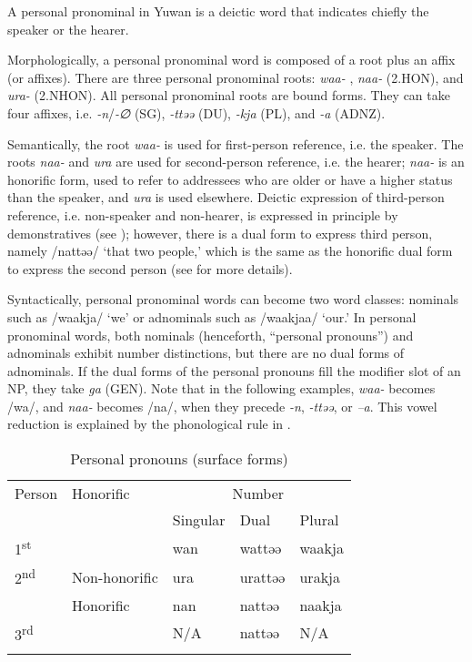 A personal pronominal in Yuwan is a deictic word that indicates chiefly the speaker or the hearer.

Morphologically, a personal pronominal word is composed of a root plus an affix (or affixes). There are three personal pronominal roots: \textit{waa-} , \textit{naa-} (2.HON), and \textit{ura-} (2.NHON). All personal pronominal roots are bound forms. They can take four affixes, i.e. \textit{{}-n}/\textit{{}-∅} (SG), \textit{{}-ttəə} (DU), \textit{{}-kja} (PL), and \textit{{}-a} (ADNZ).

Semantically, the root \textit{waa-} is used for first-person reference, i.e. the speaker. The roots \textit{naa-} and \textit{ura} are used for second-person reference, i.e. the hearer; \textit{naa-} is an honorific form, used to refer to addressees who are older or have a higher status than the speaker, and \textit{ura} is used elsewhere. Deictic expression of third-person reference, i.e. non-speaker and non-hearer, is expressed in principle by demonstratives (see ); however, there is a dual form to express third person, namely /nattəə/ ‘that two people,’ which is the same as the honorific dual form to express the second person (see  for more details).

Syntactically, personal pronominal words can become two word classes: nominals such as /waakja/ ‘we’ or adnominals such as /waakjaa/ ‘our.’ In personal pronominal words, both nominals (henceforth, “personal pronouns”) and adnominals exhibit number distinctions, but there are no dual forms of adnominals. If the dual forms of the personal pronouns fill the modifier slot of an NP, they take \textit{ga} (GEN). Note that in the following examples, \textit{waa-} becomes /wa/, and \textit{naa-} becomes /na/, when they precede \textit{{}-n}, \textit{{}-ttəə}, or \textit{–a}. This vowel reduction is explained by the phonological rule in .

\begin{table}
\caption{\label{tab:key:31}Personal pronouns (surface forms)}
\begin{tabular}{lllll}
\lsptoprule
Person & Honorific & \multicolumn{3}{c}{Number}\\\cmidrule(lr){3-5}
       &           &  Singular & Dual & Plural\\\midrule
1\textsuperscript{st}  &                & wan   & wattəə  & waakja\\
2\textsuperscript{nd}  &  Non-honorific & ura   & urattəə & urakja\\
                       &  Honorific     & nan   & nattəə  & naakja\\
3\textsuperscript{rd}  &                & N/A   & nattəə  & N/A   \\
\lspbottomrule
\end{tabular}
\end{table}

